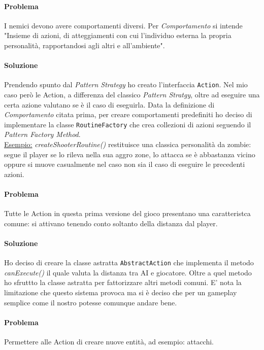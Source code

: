 \documentclass[a4paper,12pt]{report}
\begin{document}
\paragraph{Problema}
I nemici devono avere comportamenti diversi.
Per \textit{Comportamento} si intende "Insieme di azioni, di atteggiamenti con cui 
l'individuo esterna la propria personalità, rapportandosi agli altri e all'ambiente".
\paragraph{Soluzione}
Prendendo spunto dal \textit{Pattern Strategy} ho creato l'interfaccia \texttt{Action}.
Nel mio caso però le Action, a differenza del classico \textit{Pattern Stratgy}, 
oltre ad eseguire una certa azione valutano se è il caso di eseguirla.
Data la definizione di \textit{Comportamento} citata prima, per creare comportamenti predefiniti 
ho deciso di implementare la classe \texttt{RoutineFactory} che crea collezioni di azioni 
seguendo il \textit{Pattern Factory Method}.\\

\underline{Esempio:} \textit{createShooterRoutine()} restituisce una classica personalità da zombie:
segue il player se lo rileva nella sua aggro zone, lo attacca se è abbastanza vicino oppure si muove
casualmente nel caso non sia il caso di eseguire le precedenti azioni.

\paragraph{Problema}
Tutte le Action in questa prima versione del gioco presentano una caratteristca comune:
si attivano tenendo conto soltanto della distanza dal player.
\paragraph{Soluzione}
Ho deciso di creare la classe astratta \texttt{AbstractAction} che implementa il metodo \textit{canExecute()} il quale 
valuta la distanza tra AI e giocatore. Oltre a quel metodo ho sfruttto la classe astratta per fattorizzare altri metodi comuni.
E' nota la limitazione che questo sistema provoca ma si è deciso che per un gameplay semplice come il nostro
potesse comunque andare bene.

\paragraph{Problema}
Permettere alle Action di creare nuove entità, ad esempio: attacchi.
\end{document}
